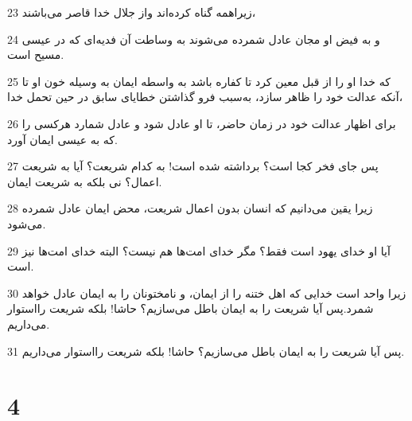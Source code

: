 \par 23 زیراهمه گناه کرده‌اند واز جلال خدا قاصر می‌باشند،
\par 24 و به فیض او مجان عادل شمرده می‌شوند به وساطت آن فدیه‌ای که در عیسی مسیح است.
\par 25 که خدا او را از قبل معین کرد تا کفاره باشد به واسطه ایمان به وسیله خون او تا آنکه عدالت خود را ظاهر سازد، به‌سبب فرو گذاشتن خطایای سابق در حین تحمل خدا،
\par 26 برای اظهار عدالت خود در زمان حاضر، تا او عادل شود و عادل شمارد هرکسی را که به عیسی ایمان آورد.
\par 27 پس جای فخر کجا است؟ برداشته شده است! به کدام شریعت؟ آیا به شریعت اعمال؟ نی بلکه به شریعت ایمان.
\par 28 زیرا یقین می‌دانیم که انسان بدون اعمال شریعت، محض ایمان عادل شمرده می‌شود.
\par 29 آیا او خدای یهود است فقط؟ مگر خدای امت‌ها هم نیست؟ البته خدای امت‌ها نیز است.
\par 30 زیرا واحد است خدایی که اهل ختنه را از ایمان، و نامختونان را به ایمان عادل خواهد شمرد.پس آیا شریعت را به ایمان باطل می‌سازیم؟ حاشا! بلکه شریعت رااستوار می‌داریم.
\par 31 پس آیا شریعت را به ایمان باطل می‌سازیم؟ حاشا! بلکه شریعت رااستوار می‌داریم.

\chapter{4}

